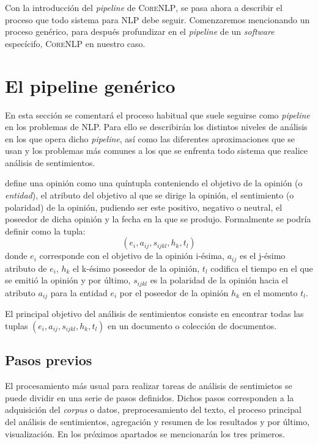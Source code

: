 Con la introducción del \emph{pipeline} de \textsc{CoreNLP}, se pasa ahora a
describir el proceso que todo sistema para \ac{NLP} debe seguir. Comenzaremos
mencionando un proceso genérico, para después profundizar en el \emph{pipeline}
de un \emph{software} especícifo, \textsc{CoreNLP} en nuestro caso.

\section{El pipeline genérico}
\label{sec:genericpipeline}

En esta sección se comentará el proceso habitual que suele seguirse como
\emph{pipeline} en los problemas de \ac{NLP}. Para ello se describirán los
distintos niveles de análisis en los que opera dicho \emph{pipeline}, así como
las diferentes aproximaciones que se usan y los problemas más comunes a los que
se enfrenta todo sistema que realice  análisis de
sentimientos.

\citet{liu:2010} define una opinión como una quíntupla conteniendo el objetivo
de la opinión (o \emph{entidad}), el atributo del objetivo al que se dirige la
opinión, el sentimiento (o polaridad) de la opinión, pudiendo ser este positivo,
negativo o neutral, el poseedor de dicha opinión y la fecha en la que se
produjo. Formalmente se podría definir como la tupla:
\[
  (e_i, a_{ij}, s_{ijkl}, h_k, t_l)
\]
donde $e_i$ corresponde con el objetivo de la opinión i-ésima, $a_{ij}$ es el
j-ésimo atributo de $e_i$, $h_k$ el k-ésimo poseedor de la opinión, $t_l$
codifica el tiempo en el que se emitió la opinión y por último, $s_{ijkl}$ es la
polaridad de la opinión hacia el atributo $a_{ij}$ para la entidad $e_i$ por el
poseedor de la opinión $h_k$ en el momento $t_l$.

El principal objetivo del análisis de sentimientos consiste en encontrar todas
las tuplas $(e_i, a_{ij}, s_{ijkl}, h_k, t_l)$ en un documento o colección de
documentos.

\subsection{Pasos previos}
\label{subsec:previousSteps}

El procesamiento más usual para realizar tareas de análisis de sentimietos se
puede dividir en una serie de pasos definidos. Dichos pasos corresponden a la
adquisición del \emph{corpus} o datos, preprocesamiento del texto, el proceso
principal del análisis de sentimientos, agregación y resumen de los resultados y
por último, visualización. En los próximos apartados se mencionarán los tres
primeros.

